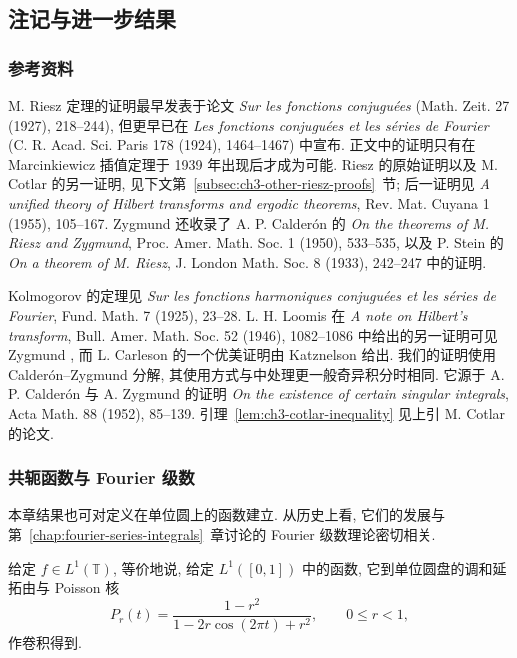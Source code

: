 \subsection{注记与进一步结果}
\label{sec:ch3-notes-further-results}

\subsubsection{参考资料}
\label{subsec:ch3-references}

M. Riesz 定理的证明最早发表于论文 \emph{Sur les fonctions conjuguées} (Math. Zeit. 27 (1927), 218--244), 但更早已在 \emph{Les fonctions conjuguées et les séries de Fourier} (C. R. Acad. Sci. Paris 178 (1924), 1464--1467) 中宣布. 正文中的证明只有在 Marcinkiewicz 插值定理于 1939 年出现后才成为可能. Riesz 的原始证明以及 M. Cotlar 的另一证明, 见下文第~\ref{subsec:ch3-other-riesz-proofs}~节; 后一证明见 \emph{A unified theory of Hilbert transforms and ergodic theorems}, Rev. Mat. Cuyana 1 (1955), 105--167. Zygmund  还收录了 A. P. Calderón 的 \emph{On the theorems of M. Riesz and Zygmund}, Proc. Amer. Math. Soc. 1 (1950), 533--535, 以及 P. Stein 的 \emph{On a theorem of M. Riesz}, J. London Math. Soc. 8 (1933), 242--247 中的证明.

Kolmogorov 的定理见 \emph{Sur les fonctions harmoniques conjuguées et les séries de Fourier}, Fund. Math. 7 (1925), 23--28. L. H. Loomis 在 \emph{A note on Hilbert's transform}, Bull. Amer. Math. Soc. 52 (1946), 1082--1086 中给出的另一证明可见 Zygmund , 而 L. Carleson 的一个优美证明由 Katznelson  给出. 我们的证明使用 Calderón--Zygmund 分解, 其使用方式与中处理更一般奇异积分时相同. 它源于 A. P. Calderón 与 A. Zygmund 的证明 \emph{On the existence of certain singular integrals}, Acta Math. 88 (1952), 85--139. 引理~\ref{lem:ch3-cotlar-inequality} 见上引 M. Cotlar 的论文.

\subsubsection{共轭函数与 Fourier 级数}
\label{subsec:ch3-conjugate-function-fourier-series}

本章结果也可对定义在单位圆上的函数建立. 从历史上看, 它们的发展与第~\ref{chap:fourier-series-integrals}~章讨论的 Fourier 级数理论密切相关.

给定 $f\in L^1(\mathbb T)$, 等价地说, 给定 $L^1([0,1])$ 中的函数, 它到单位圆盘的调和延拓由与 Poisson 核
\[
 P_r(t)=\frac{1-r^2}{1-2r\cos(2\pi t)+r^2},
 \qquad 0\le r<1,
\]
作卷积得到.

